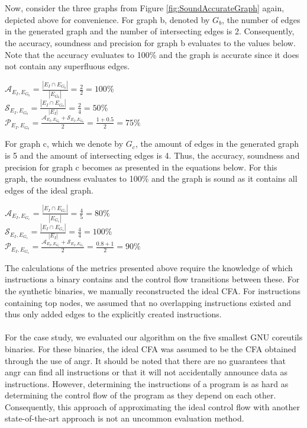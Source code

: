 \documentclass{kththesis}
\begin{document}
\\ \\
Now, consider the three graphs from Figure \ref{fig:SoundAccurateGraph} again, depicted above for convenience. For graph b, denoted by $G_b$, the number of edges in the generated graph and the number of intersecting edges is 2. Consequently, the accuracy, soundness and precision for graph b evaluates to the values below. Note that the accuracy evaluates to 100\% and the graph is accurate since it does not contain any superfluous edges. 
\begin{center}
$\mathcal{A}_{E_I,E_{G_b}} = \frac{|E_I \cap E_{G_b}|}{|E_{G_b}|}=\frac{2}{2}=100\%$\\ $\mathcal{S}_{E_I,E_{G_b}} = \frac{|E_I \cap E_{G_b}|}{|E_I|}=\frac{2}{4}=50\%$\\
$ \mathcal{P}_{E_I,E_{G_b}} = \frac{\mathcal{A}_{E_I,E_{G_b}}+\mathcal{S}_{E_I,E_{G_b}}}{2}=\frac{1+0.5}{2}=75\%$\\
\end{center}
For graph c, which we denote by $G_c$, the amount of edges in the generated graph is 5 and the amount of intersecting edges is 4. Thus, the accuracy, soundness and precision for graph c becomes as presented in the equations below. For this graph, the soundness evaluates to 100\% and the graph is sound as it contains all edges of the ideal graph. 
\begin{center}
$\mathcal{A}_{E_I,E_{G_c}} = \frac{|E_I \cap E_{G_c}|}{|E_{G_c}|}=\frac{4}{5}=80\%$\\ $\mathcal{S}_{E_I,E_{G_c}} = \frac{|E_I \cap E_{G_c}|}{|E_I|}=\frac{4}{4}=100\%$\\
$ \mathcal{P}_{E_I,E_{G_c}} = \frac{\mathcal{A}_{E_I,E_{G_c}}+\mathcal{S}_{E_I,E_{G_c}}}{2}=\frac{0.8+1}{2}=90\%$\\
\end{center}
The calculations of the metrics presented above require the knowledge of which instructions a binary contains and the control flow transitions between these. For the synthetic binaries, we manually reconstructed the ideal CFA. For instructions containing top nodes, we assumed that no overlapping instructions existed and thus only added edges to the explicitly created instructions.
\\ \\
For the case study, we evaluated our algorithm on the five smallest GNU coreutils binaries. For these binaries, the ideal CFA was assumed to be the CFA obtained through the use of angr\cite{angr}. It should be noted that there are no guarantees that angr can find all instructions or that it will not accidentally announce data as instructions. However, determining the instructions of a program is as hard as determining the control flow of the program as they depend on each other. Consequently, this approach of approximating the ideal control flow with another state-of-the-art approach is not an uncommon evaluation method\cite{preciseCFG}\cite{alternating}.
\end{document}
